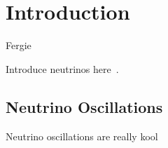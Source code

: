 \chapter{Introduction}
\label{chap:SomeStuff}



%
{Fergie}%

Introduce neutrinos here~\cite{Phys.Rev.Lett.19.1264, Phys.Rev.D2.1285,hep-ph/0410370}.

\section{Neutrino Oscillations}
\label{sec:neutrinooscillations}
Neutrino oscillations are really kool
